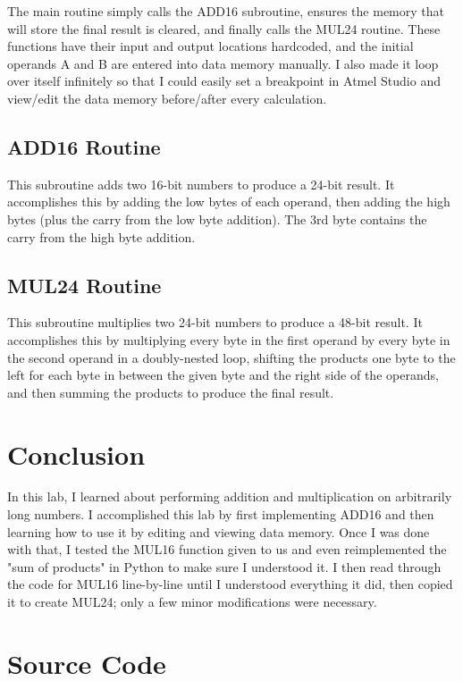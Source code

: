 \documentclass[12pt,letterpaper]{article}
\begin{document}
The main routine simply calls the ADD16 subroutine, ensures the memory that
will store the final result is cleared, and finally calls the MUL24 routine.
These functions have their input and output locations hardcoded, and the
initial operands A and B are entered into data memory manually.  I also made it
loop over itself infinitely so that I could easily set a breakpoint in Atmel
Studio and view/edit the data memory before/after every calculation.

\subsection{ADD16 Routine}

This subroutine adds two 16-bit numbers to produce a 24-bit result.  It
accomplishes this by adding the low bytes of each operand, then adding the high
bytes (plus the carry from the low byte addition).  The 3rd byte contains the
carry from the high byte addition.

\subsection{MUL24 Routine}

This subroutine multiplies two 24-bit numbers to produce a 48-bit result.  It
accomplishes this by multiplying every byte in the first operand by every byte
in the second operand in a doubly-nested loop, shifting the products one byte
to the left for each byte in between the given byte and the right side of the
operands, and then summing the products to produce the final result.

\section{Conclusion}

In this lab, I learned about performing addition and multiplication on
arbitrarily long numbers.  I accomplished this lab by first implementing ADD16
and then learning how to use it by editing and viewing data memory.  Once I was
done with that, I tested the MUL16 function given to us and even reimplemented
the "sum of products" in Python to make sure I understood it.  I then read
through the code for MUL16 line-by-line until I understood everything it did,
then copied it to create MUL24; only a few minor modifications were necessary.

\section{Source Code}
\end{document}

